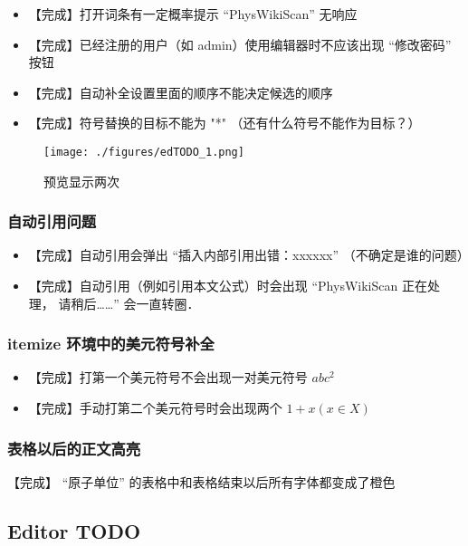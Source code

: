 \begin{itemize}
\item 【完成】打开词条有一定概率提示 “PhysWikiScan” 无响应

\item 【完成】已经注册的用户（如 admin）使用编辑器时不应该出现 “修改密码” 按钮

\item 【完成】自动补全设置里面的顺序不能决定候选的顺序

\item 【完成】符号替换的目标不能为 "*" （还有什么符号不能作为目标？）
\end{itemize}

\begin{figure}[ht]
\centering
\texttt{[image: ./figures/edTODO\_1.png]}
\caption{预览显示两次} \label{edTODO_fig1}
\end{figure}

\subsubsection{自动引用问题}
\begin{itemize}
\item 【完成】自动引用会弹出 “插入内部引用出错：xxxxxx” （不确定是谁的问题）
\item 【完成】自动引用（例如引用本文公式）时会出现 “PhysWikiScan 正在处理， 请稍后……” 会一直转圈．
\end{itemize}

\subsubsection{itemize 环境中的美元符号补全}
\begin{itemize}
\item 【完成】打第一个美元符号不会出现一对美元符号 $abc^2$

\item 【完成】手动打第二个美元符号时会出现两个 $1 + x (x \in X)$
\end{itemize}

\subsubsection{表格以后的正文高亮}
【完成】 “原子单位” 的表格中和表格结束以后所有字体都变成了橙色

\subsection{Editor TODO}

